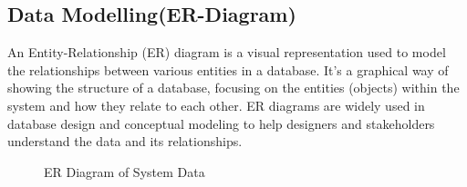 \subsection{Data Modelling(ER-Diagram)}
An Entity-Relationship (ER) diagram is a visual representation used to model the relationships between various entities in a database. It's a graphical way of showing the structure of a database, focusing on the entities (objects) within the system and how they relate to each other. ER diagrams are widely used in database design and conceptual modeling to help designers and stakeholders understand the data and its relationships.
\begin{figure}[H]
    \caption{ER Diagram of System Data}
\end{figure}
\newpage
